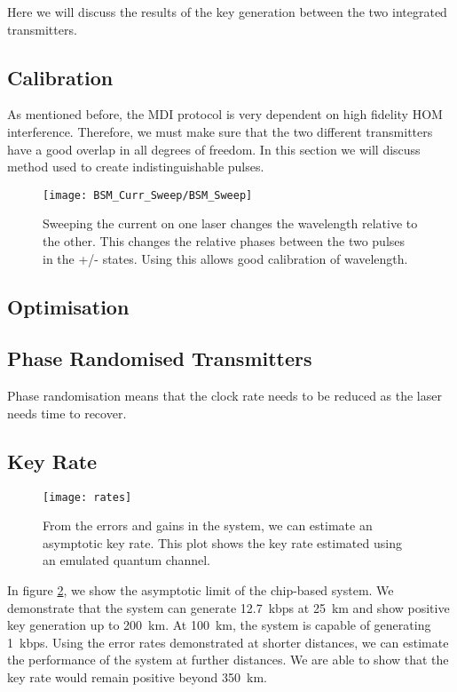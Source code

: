 Here we will discuss the results of the key generation between the two integrated transmitters.

\subsection{Calibration}

As mentioned before, the \ac{MDI} protocol is very dependent on high fidelity \ac{HOM} interference. Therefore, we must make sure that the two different transmitters have a good overlap in all degrees of freedom. In this section we will discuss method used to create indistinguishable pulses.

\begin{figure}[tbp]
	\centering
	\texttt{[image: BSM\_Curr\_Sweep/BSM\_Sweep]}
	\caption[Laser current-error sweep]{Sweeping the current on one laser changes the wavelength relative to the other. This changes the relative phases between the two pulses in the +/- states. Using this allows good calibration of wavelength.}
	\label{fig:wavelength_cal}
\end{figure}


\subsection{Optimisation}

\subsection{Phase Randomised Transmitters}

Phase randomisation means that the clock rate needs to be reduced as the laser needs time to recover. 

\subsection{Key Rate}

\begin{figure}
	\centering
	\texttt{[image: rates]}
	\caption[Asymptotic key rates of chip-based MDI-QKD]{From the errors and gains in the system, we can estimate an asymptotic key rate. This plot shows the key rate estimated using an emulated quantum channel.}
	\label{fig:mdi_rates}
\end{figure}

In figure \ref{fig:mdi_rates}, we show the asymptotic limit of the chip-based system. We demonstrate that the system can generate \SI{12.7}{kbps} at \SI{25}{\km} and show positive key generation up to \SI{200}{\km}. At \SI{100}{\km}, the system is capable of generating \SI{1}{kbps}. Using the error rates demonstrated at shorter distances, we can estimate the performance of the system at further distances. We are able to show that the key rate would remain positive beyond \SI{350}{\km}.

